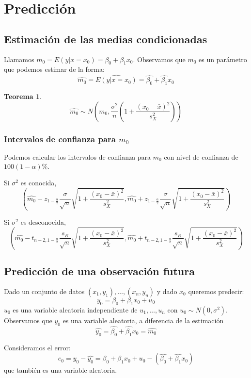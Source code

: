 \documentclass{report}
\newtheorem{theorem}{Teorema}[chapter]
\theoremstyle{remark}
\theoremstyle{remark}
\theoremstyle{remark}
\theoremstyle{definition}
\theoremstyle{definition}
\theoremstyle{definition}
\begin{document}
\section{Predicción}

\subsection*{Estimación de las medias condicionadas}
Llamamos $m_0 = E(y | x=x_0) = \beta_0 + \beta_1x_0$.
Observamos que $m_0$ es un parámetro que podemos estimar de la forma:
$$\hat{m_0} = \hat{E(y | x=x_0)} = \hat{\beta_0} + \hat{\beta_1}x_0$$

\begin{theorem}
    $$\hat{m_0} \sim N\left( m_0, \frac{\sigma^2}{n} \left(1+\frac{(x_0-\bar{x})^2}{s_X^2}\right) \right)$$
\end{theorem}

\subsubsection*{Intervalos de confianza para $m_0$}
Podemos calcular los intervalos de confianza para $m_0$ con nivel de confianza de $100(1-\alpha)\%$.

Si $\sigma^2$ es conocida,
$$\left( \hat{m_0} - z_{1-\frac{\alpha}{2}} \frac{\sigma}{\sqrt{n}} \sqrt{1 + \frac{(x_0-\bar{x})^2}{s_X^2}}, \hat{m_0} + z_{1-\frac{\alpha}{2}} \frac{\sigma}{\sqrt{n}} \sqrt{1 + \frac{(x_0-\bar{x})^2}{s_X^2}} \right)$$

Si $\sigma^2$ es desconocida,
$$\left( \hat{m_0} - t_{n-2, 1-\frac{\alpha}{2}} \frac{s_R}{\sqrt{n}} \sqrt{1 + \frac{(x_0-\bar{x})^2}{s_X^2}}, \hat{m_0} + t_{n-2, 1-\frac{\alpha}{2}} \frac{s_R}{\sqrt{n}} \sqrt{1 + \frac{(x_0-\bar{x})^2}{s_X^2}} \right)$$

\subsection*{Predicción de una observación futura}
Dado un conjunto de datos $(x_1, y_1), \dots, (x_n, y_n)$ y dado $x_0$ queremos predecir:
$$y_0 = \beta_0 + \beta_1 x_0 + u_0$$
$u_0$ es una variable aleatoria independiente de $u_1, \dots, u_n$ con $u_0 \sim N(0, \sigma^2)$.
Observamos que $y_0$ es una variable aleatoria, a diferencia de la estimación $$\hat{y_0} = \hat{\beta_0} + \hat{\beta_1}x_0 = \hat{m_0}$$

Consideramos el error:
$$e_0 = y_0 - \hat{y_0} = \beta_0 + \beta_1x_0 + u_0 - (\hat{\beta_0} + \hat{\beta_1}x_0)$$
que también es una variable aleatoria.
\end{document}
